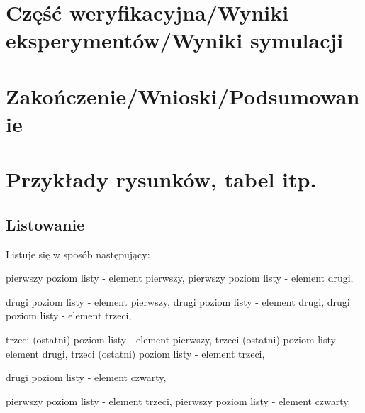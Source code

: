 \newpage
\section[Część weryfikacyjna]{Część weryfikacyjna/Wyniki eksperymentów/Wyniki symulacji}


\section[Zakończenie]{Zakończenie/Wnioski/Podsumowanie}


\newpage
\section[Przykłady]{Przykłady rysunków, tabel itp.}
\subsection{Listowanie}
Listuje się w sposób następujący:
\begin{itemize}
	\itemi pierwszy poziom listy - element pierwszy,
	\itemi pierwszy poziom listy - element drugi,
	\begin{itemize}
		\itemii drugi poziom listy - element pierwszy,
		\itemii drugi poziom listy - element drugi,
		\itemii drugi poziom listy - element trzeci,
		\begin{itemize}
			\itemiii trzeci (ostatni) poziom listy - element pierwszy,
			\itemiii trzeci (ostatni) poziom listy - element drugi,
			\itemiii trzeci (ostatni) poziom listy - element trzeci,
		\end{itemize}
		\itemii drugi poziom listy - element czwarty,
		\end{itemize}
	\itemi pierwszy poziom listy - element trzeci,
	\itemi pierwszy poziom listy - element czwarty.
\end{itemize}

\newpage



